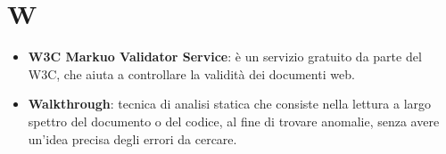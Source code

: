 \section{W}
\begin{itemize}
	\item
	\textbf{W3C Markuo Validator Service}: è un servizio gratuito da parte del W3C, che aiuta a controllare la validità dei documenti web.
	\item
	\textbf{Walkthrough}: tecnica di analisi statica che consiste nella 
	lettura a largo spettro del documento o del codice, al fine di trovare anomalie, senza avere un'idea precisa degli errori da cercare.
\end{itemize}